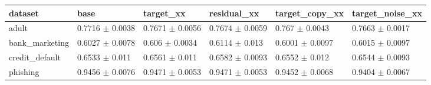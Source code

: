 \begin{tabular}{llllll}
\toprule
dataset & base & target\_xx & residual\_xx & target\_copy\_xx & target\_noise\_xx \\
\midrule
adult & 0.7716 $\pm$ 0.0038 & 0.7671 $\pm$ 0.0056 & 0.7674 $\pm$ 0.0059 & 0.767 $\pm$ 0.0043 & 0.7663 $\pm$ 0.0017 \\
bank\_marketing & 0.6027 $\pm$ 0.0078 & 0.606 $\pm$ 0.0034 & 0.6114 $\pm$ 0.013 & 0.6001 $\pm$ 0.0097 & 0.6015 $\pm$ 0.0097 \\
credit\_default & 0.6533 $\pm$ 0.011 & 0.6561 $\pm$ 0.011 & 0.6582 $\pm$ 0.0093 & 0.6552 $\pm$ 0.012 & 0.6544 $\pm$ 0.0093 \\
phishing & 0.9456 $\pm$ 0.0076 & 0.9471 $\pm$ 0.0053 & 0.9471 $\pm$ 0.0053 & 0.9452 $\pm$ 0.0068 & 0.9404 $\pm$ 0.0067 \\
\bottomrule
\end{tabular}
